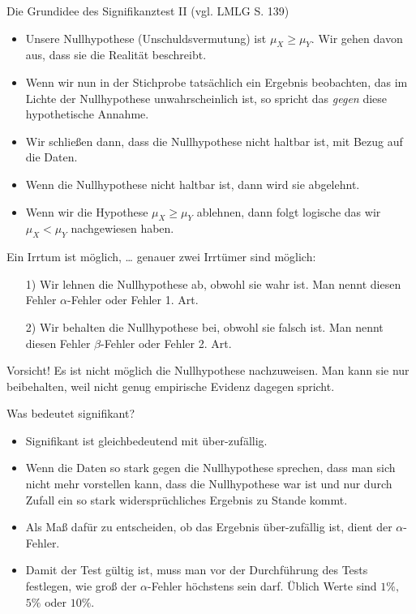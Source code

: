 \documentclass[usenames,dvipsnames,handout]{beamer}
\begin{document}
\begin{frame}{Die Grundidee des Signifikanztest II (vgl. LMLG S. 139)}
\begin{itemize}
\item{Unsere Nullhypothese (Unschuldsvermutung) ist $\mu_{X} \geq \mu_{Y}.$ Wir gehen davon aus, dass sie die Realität
beschreibt.}\pause
\item{Wenn wir nun in der Stichprobe tatsächlich ein Ergebnis beobachten, das im Lichte der Nullhypothese unwahrscheinlich ist, so spricht
das \textit{gegen} diese hypothetische Annahme. }\pause
\item{Wir schließen dann, dass die Nullhypothese nicht haltbar ist, mit Bezug auf die Daten.}\pause
\item{Wenn die Nullhypothese nicht haltbar ist, dann wird sie abgelehnt. }
\item{Wenn wir die Hypothese $\mu_{X} \geq \mu_{Y}$ ablehnen, dann folgt logische das wir $\mu_{X} < \mu_{Y}$ nachgewiesen haben.}
\end{itemize}
\end{frame}


\begin{frame}{Ein Irrtum ist möglich, \dots}
genauer zwei Irrtümer sind möglich:
\begin{itemize}
\item[1)]{Wir lehnen die Nullhypothese ab, obwohl sie wahr ist. Man nennt diesen Fehler $\alpha$-Fehler oder Fehler 1. Art.}
\item[2)]{Wir behalten die Nullhypothese bei, obwohl sie falsch ist. Man nennt diesen Fehler $\beta$-Fehler oder Fehler 2. Art.}
\end{itemize}
\begin{block}{Vorsicht!}
Es ist nicht möglich die Nullhypothese nachzuweisen. Man kann sie nur beibehalten, weil nicht genug empirische 
Evidenz dagegen spricht.
\end{block}
\end{frame}

\begin{frame}{Was bedeutet signifikant?}
\begin{itemize}
\item{Signifikant ist gleichbedeutend mit über-zufällig.}
\item{Wenn die Daten so stark gegen die Nullhypothese sprechen, dass man sich nicht mehr vorstellen kann,
dass die Nullhypothese war ist und nur durch Zufall ein so stark widersprüchliches Ergebnis zu Stande kommt.}\pause
\item{Als Maß dafür zu entscheiden, ob das Ergebnis über-zufällig ist, dient der $\alpha$-Fehler.}\pause
\item{Damit der Test gültig ist, muss man vor der Durchführung des Tests festlegen, wie groß
der $\alpha$-Fehler höchstens sein darf. Üblich Werte sind $1\%,$ $5\%$ oder $10\%.$}
\end{itemize}
\end{frame}
\end{document}
